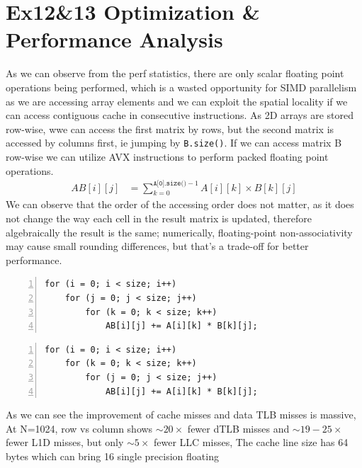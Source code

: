 \documentclass[9pt]{extarticle}
\begin{document}
\section*{Ex12\&13 Optimization \& Performance Analysis}
As we can observe from the perf statistics, there are only scalar floating point operations being performed, 
which is a wasted opportunity for SIMD parallelism as we are accessing array elements and we can exploit the spatial locality 
if we can access contiguous cache in consecutive instructions. As 2D arrays are stored row-wise, wwe can access the first matrix by rows, 
but the second matrix is accessed by columns first, ie jumping by \texttt{B.size()}. If we can access matrix B row-wise we can utilize AVX
instructions to perform packed floating point operations. 
\begin{align*}
    AB[i][j] &= \sum_{k=0}^{\texttt{A[0].size()}-1} A[i][k] \times B[k][j]
\end{align*}
We can observe that the order of the accessing order does not matter, as it does not change the way each cell in the result matrix is updated, 
therefore algebraically the result is the same; numerically, floating-point non-associativity may cause small rounding differences, but that's 
a trade-off for better performance.
\par\vspace{3ex}
\begin{minipage}{0.4\linewidth}
\begin{Verbatim}[frame=topline,numbers=left,label= Original,framesep=3mm]
for (i = 0; i < size; i++)
    for (j = 0; j < size; j++)
        for (k = 0; k < size; k++)
            AB[i][j] += A[i][k] * B[k][j];
\end{Verbatim}
\end{minipage}\hfill
\begin{minipage}{0.4\linewidth}
\begin{Verbatim}[frame=topline,numbers=left,label= Optimized,framesep=3mm]
for (i = 0; i < size; i++)
    for (k = 0; k < size; k++)
        for (j = 0; j < size; j++)
            AB[i][j] += A[i][k] * B[k][j];
\end{Verbatim}
\end{minipage}\hfill
\par\vspace{1.5ex}
As we can see the improvement of cache misses and data TLB misses is massive, At 
N=1024, row vs column shows $\sim 20 \times$ fewer dTLB misses and $\sim 19-25\times$ fewer L1D misses, 
but only $\sim 5 \times$ fewer LLC misses, The cache line size has 64 bytes which can bring 16 single precision floating
\end{document}
